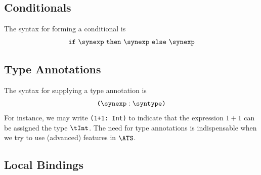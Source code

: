 \subsection{Conditionals}
The syntax for forming a conditional is
\[\begin{array}{c}
\texttt{if}~\synexp~\texttt{then}~\synexp~\texttt{else}~\synexp
\end{array}\]

\subsection{Type Annotations}
The syntax for supplying a type annotation is
\[\begin{array}{c}
\texttt{(}\synexp:\syntype\texttt{)}
\end{array}\]
For instance, we may write \texttt{(1+1: Int)} to indicate that the
expression $1+1$ can be assigned the type $\tInt$. The need for type
annotations is indispensable when we try to use (advanced) features in
$\ATS$.

\subsection{Local Bindings}

